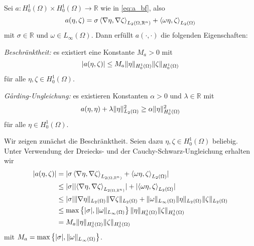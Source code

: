 \begin{Lemma}
    \label{lemma:a_bf_bounded_garding}
    Sei $a \colon H^{1}_{0}(\Omega) \times H^{1}_{0}(\Omega) \to \mathbb{R}$ wie in \eqref{eq:a_bf}, also
    \begin{equation}
        a(\eta, \zeta) = \sigma \left\langle\nabla \eta,\nabla \zeta\right\rangle_{L_{2}(\Omega, \mathbb{R}^{n})} + \left\langle\omega \eta,\zeta\right\rangle_{L_{2}(\Omega)}
    \end{equation}
    mit $\sigma \in \mathbb{R}$ und $\omega \in L_{\infty}(\Omega)$.
    Dann erfüllt $a(\cdot, \cdot)$ die folgenden Eigenschaften:
    \begin{thmenumerate}
        \item \emph{Beschränktheit:} es existiert eine Konstante $M_{a} > 0$ mit
        \begin{equation}
            \lvert a(\eta, \zeta)\rvert \leq M_{a} \lVert\eta\rVert_{H^{1}_{0}(\Omega)} \lVert\zeta\rVert_{H^{1}_{0}(\Omega)}
        \end{equation}
        für alle $\eta, \zeta \in H^{1}_{0}(\Omega)$.
        \label{lemma:a_bf_bounded_garding:1}
        \item \emph{G\aa{}rding-Ungleichung:} es existieren Konstanten $\alpha > 0$ und $\lambda \in \mathbb{R}$ mit
        \begin{equation}
                a(\eta, \eta) + \lambda \lVert\eta\rVert_{L_{2}(\Omega)}^{2} \geq \alpha \lVert\eta\rVert_{H^{1}_{0}(\Omega)}^{2}
        \end{equation}
        für alle $\eta \in H^{1}_{0}(\Omega)$.
        \label{lemma:a_bf_bounded_garding:2}
    \end{thmenumerate}

    \begin{Beweis}
    Wir zeigen zunächst die Beschränktheit.
    Seien dazu $\eta, \zeta \in H^{1}_{0}(\Omega)$ beliebig.
    Unter Verwendung der Dreiecks- und der Cauchy-Schwarz-Ungleichung erhalten wir
    \begin{align}
        \lvert a(\eta, \zeta)\rvert
        &= \lvert\sigma \left\langle\nabla \eta,\nabla \zeta\right\rangle_{L_{2(\Omega, \mathbb{R}^{n})}} + \left\langle\omega \eta,\zeta\right\rangle_{L_{2}(\Omega)}\rvert
        \\&\leq \lvert\sigma\rvert \lvert\left\langle\nabla \eta,\nabla \zeta\right\rangle_{L_{2(\Omega, \mathbb{R}^{n})}}\rvert + \lvert\left\langle\omega \eta,\zeta\right\rangle_{L_{2}(\Omega)}\rvert
        \\&\leq \lvert\sigma\rvert \lVert\nabla \eta\rVert_{L_{2}(\Omega)} \lVert\nabla \zeta\rVert_{L_{2}(\Omega)} + \lVert\omega\rVert_{L_{\infty}(\Omega)} \lVert\eta\rVert_{L_{2}(\Omega)} \lVert\zeta\rVert_{L_{2}(\Omega)}
        \\&\leq \max \left\{ \lvert\sigma\rvert, \lVert\omega\rVert_{L_{\infty}(\Omega)} \right\} \lVert\eta\rVert_{H^{1}_{0}(\Omega)} \lVert\zeta\rVert_{H^{1}_{0}(\Omega)}
        \\&= M_{a} \lVert\eta\rVert_{H^{1}_{0}(\Omega)} \lVert\zeta\rVert_{H^{1}_{0}(\Omega)}
    \end{align}
    mit $M_{a} = \max \left\{ \lvert\sigma\rvert, \lVert\omega\rVert_{L_{\infty}(\Omega)} \right\}$.


\end{Beweis}
\end{Lemma}
